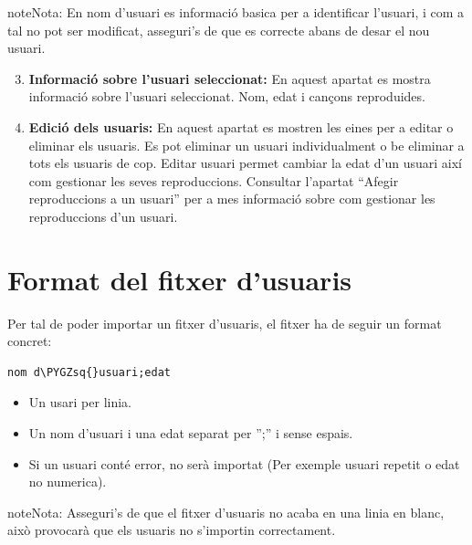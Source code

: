 \documentclass[a4paper,10pt,oneside]{sphinxmanual}
\def\PYGZsq{\char`\'}
\renewcommand\PYGZsq{\textquotesingle}
\begin{document}
\begin{notice}{note}{Nota:}
En nom d'usuari es informació basica per a identificar l'usuari, i com a tal no pot ser modificat, asseguri's de que es correcte abans de desar el nou usuari.
\end{notice}
\begin{enumerate}
\setcounter{enumi}{2}
\item {} 
\textbf{Informació sobre l'usuari seleccionat:} En aquest apartat es mostra informació sobre l'usuari seleccionat. Nom, edat i cançons reproduides.

\item {} 
\textbf{Edició dels usuaris:} En aquest apartat es mostren les eines per a editar o eliminar els usuaris. Es pot eliminar un usuari individualment o be eliminar a tots els usuaris de cop. Editar usuari permet cambiar la edat d'un usuari així com gestionar les seves reproduccions. Consultar l'apartat ``Afegir reproduccions a un usuari'' per a mes informació sobre com gestionar les reproduccions d'un usuari.

\end{enumerate}


\section{Format del fitxer d'usuaris}
\label{gest_usuaris:format-del-fitxer-d-usuaris}
Per tal de poder importar un fitxer d'usuaris, el fitxer ha de seguir un format concret:

\begin{Verbatim}[commandchars=\\\{\}]
nom d\PYGZsq{}usuari;edat
\end{Verbatim}
\begin{itemize}
\item {} 
Un usari per linia.

\item {} 
Un nom d'usuari i una edat separat per '';'' i sense espais.

\item {} 
Si un usuari conté error, no serà importat (Per exemple usuari repetit o edat no numerica).

\end{itemize}

\begin{notice}{note}{Nota:}
Asseguri's de que el fitxer d'usuaris no acaba en una linia en blanc, això provocarà que els usuaris no s'importin correctament.
\end{notice}
\end{document}
